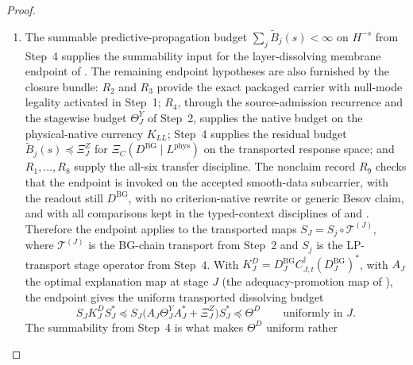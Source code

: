 \documentclass[11pt]{article}
\newcommand{\preceqq}{\preceq}
\newcommand{\DBG}{D^{\mathrm{BG}}}
\newcommand{\Lphys}{L^{\mathrm{phys}}}
\newcommand{\LPtr}{S_j}
\theoremstyle{definition}
\begin{document}
\begin{proof}
\begin{enumerate}[label=\emph{Step \arabic*.}]
summable on its own.  Third, \(R_6\) supplies the
Littlewood--Paley transport stage operator
\(\LPtr\colon L^2(P_j)\to H^{-s}\), with
\(\|\LPtr\|^2\simeq 2^{-2sj}\) for \(s\geq p\).  The LP-transport
rescue  multiplies the half-log
budget by this operator-norm decay and gives the transported budget
on the response space \(H^{-s}\),
\[
  \widetilde B_j(s)
  \simeq
  2^{2(p-s)j}\bigl(1+\mu\sqrt{L_j}\bigr)
  e^{-2c\mu\sqrt{L_j}},
  \qquad
  \frac{\widetilde B_{j+1}(s)}{\widetilde B_j(s)}
  \longrightarrow 2^{2(p-s)}<1
  \quad(s>p).
\]
Thus the transported budget is geometrically contractive on a cofinal
tail of stages and \(\sum_{j\geq0}\widetilde B_j(s)<\infty\).  This
is exactly the summable predictive-propagation budget required by
\citet{Tsiokos2026NeedleKiller}, and it is the input consumed by
Step~5.
\item The summable predictive-propagation budget
\(\sum_j\widetilde B_j(s)<\infty\) on \(H^{-s}\) from Step~4 supplies
the summability input for the layer-dissolving membrane endpoint of
\citet{Tsiokos2026NeedleKiller}.  The remaining endpoint hypotheses are
also furnished by the closure bundle: \(R_2\) and \(R_3\) provide the
exact packaged carrier with null-mode legality activated in Step~1;
\(R_4\), through the source-admission recurrence and the stagewise
budget \(\Theta^Y_J\) of Step~2, supplies the native budget on the
physical-native currency \(K_{LL}\); Step~4 supplies the residual budget
\(\widetilde B_j(s)\preceqq\Xi^Z_J\) for
\(\Xi_C(\DBG\mid\Lphys)\) on the transported response space; and
\(R_1,\ldots,R_8\) supply the all-six transfer discipline.  The
nonclaim record \(R_9\) checks that the endpoint is invoked on the
accepted smooth-data subcarrier, with the readout still \(\DBG\), with
no criterion-native rewrite or generic Besov claim, and with all
comparisons kept in the typed-context disciplines of
\citet{Tsiokos2026NeedleKiller} and
\citet{Tsiokos2026XiCompanion}.  Therefore the endpoint applies to the
transported maps \(S_J=\LPtr\circ\mathcal T^{(J)}\), where
\(\mathcal T^{(J)}\) is the BG-chain transport from Step~2 and \(\LPtr\)
is the LP-transport stage operator from Step~4.  With
\(K^D_J=\DBG_J C_{J,t}^{\dagger}(\DBG_J)^*\), with \(A_J\) the optimal
explanation map at stage \(J\) (the adequacy-promotion map of
\citet{Tsiokos2026XiCompanion}), the endpoint gives the uniform
transported dissolving budget
\[
  S_J K^D_J S_J^*
  \preceqq
  S_J\bigl(A_J\Theta^Y_J A_J^*+\Xi^Z_J\bigr)S_J^*
  \preceqq
  \Theta^D
  \qquad\text{uniformly in }J .
\]
The summability from Step~4 is what makes \(\Theta^D\) uniform rather

\end{enumerate}
\end{proof}
\end{document}
